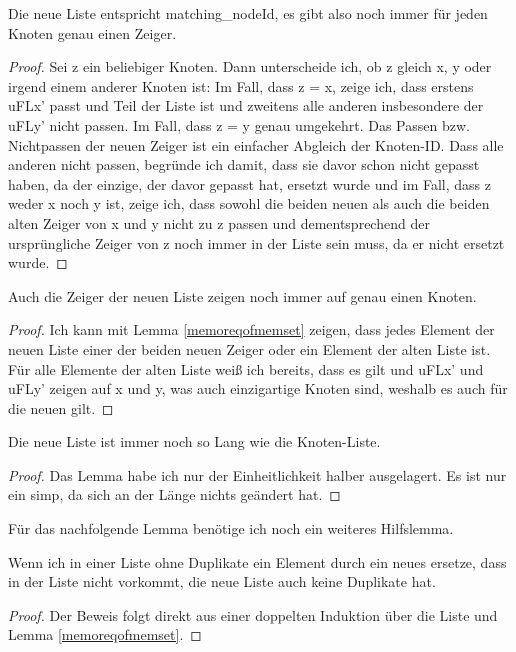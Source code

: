 \begin{lemma}[\KruskalupdateunionFindmatchingnodeId]
  Die neue Liste entspricht matching\_nodeId, es gibt also noch immer für jeden Knoten genau einen Zeiger.
\end{lemma}
\begin{proof}
  Sei z ein beliebiger Knoten.
  Dann unterscheide ich, ob z gleich x, y oder irgend einem anderer Knoten ist:
  Im Fall, dass z = x, zeige ich, dass erstens uFLx' passt und Teil der Liste ist und zweitens alle anderen insbesondere der uFLy' nicht passen.
  Im Fall, dass z = y genau umgekehrt.
  Das Passen bzw. Nichtpassen der neuen Zeiger ist ein einfacher Abgleich der Knoten-ID. 
  Dass alle anderen nicht passen, begründe ich damit, dass sie davor schon nicht gepasst haben, da der einzige, der davor gepasst hat, ersetzt wurde
  und im Fall, dass z weder x noch y ist, zeige ich, dass sowohl die beiden neuen als auch die beiden alten Zeiger von x
  und y nicht zu z passen und dementsprechend der ursprüngliche Zeiger von z noch immer in der Liste sein muss, da er nicht ersetzt wurde.
\end{proof}

\begin{lemma}[\KruskalupdateunionFindmatchingparentId]
  Auch die Zeiger der neuen Liste zeigen noch immer auf genau einen Knoten.
\end{lemma}
\begin{proof}
  Ich kann mit Lemma \ref{memoreqofmemset} zeigen, dass jedes Element der neuen Liste einer der beiden neuen Zeiger oder ein Element der alten Liste ist.
  Für alle Elemente der alten Liste weiß ich bereits, dass es gilt und uFLx' und uFLy' zeigen auf x und y, was auch einzigartige Knoten sind, weshalb es auch für die neuen gilt.
\end{proof}

\begin{lemma}[\KruskalupdateunionFindmatchinglength]
  Die neue Liste ist immer noch so Lang wie die Knoten-Liste.
\end{lemma}
\begin{proof}
  Das Lemma habe ich nur der Einheitlichkeit halber ausgelagert.
  Es ist nur ein simp, da sich an der Länge nichts geändert hat.
\end{proof}

Für das nachfolgende Lemma benötige ich noch ein weiteres Hilfslemma.

\begin{lemma}[\nodupsetofnotmem]
  Wenn ich in einer Liste ohne Duplikate ein Element durch ein neues ersetze, dass in der Liste nicht vorkommt, die neue Liste auch keine Duplikate hat.
\end{lemma}
\begin{proof}
  Der Beweis folgt direkt aus einer doppelten Induktion über die Liste und Lemma \ref{memoreqofmemset}.
\end{proof}

